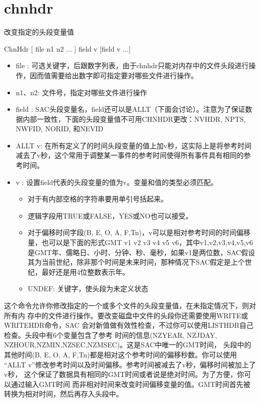\section{chnhdr}
\label{cmd:chnhdr}

改变指定的头段变量值

ChnHdr [ file n1 n2 ... ] field v [field v ...]

\begin{itemize}
\item file : 可选关键字，后跟数字列表，由于chnhdr只能对内存中的文件头段进行操作，因而值需要给出数字即可指定要对哪些文件进行操作。
\item n1、n2: 文件号，指定对哪些文件进行操作
\item field : SAC头段变量名，field还可以是ALLT（下面会讨论）。注意为了保证数据内部一致性，下面的头段变量值不可用CHNHDR更改：NVHDR, NPTS, NWFID, NORID, 和NEVID
\item ALLT v: 在所有定义了的时间头段变量的值上加v秒，这实际上是将参考时间减去了v秒，这个常用于调整某一事件的参考时间使得所有事件具有相同的参考时间。
\item v : 设置field代表的头段变量的值为v。变量和值的类型必须匹配。
	\begin{itemize}
	\item 对于有内部空格的字符串要用单引号括起来。
	\item 逻辑字段用TRUE或FALSE，YES或NO也可以接受。
	\item 对于偏移时间字段(B, E, O, A, F,Tn)，v可以是相对参考时间的时间偏移量，也可以是下面的形式GMT v1 v2 v3 v4 v5 v6，其中v1,v2,v3,v4,v5,v6是GMT年、儒略日、小时、分钟、秒、毫秒，如果v1是两位数，SAC假设其为当前世纪，除非那个时间是未来时间，那种情况下SAC假定是上个世纪，最好还是用4位整数表示年。
	\item UNDEF: 关键字，使头段为未定义状态
	\end{itemize}
\end{itemize}

这个命令允许你修改指定的一个或多个文件的头段变量值，在未指定情况下，则对所有内
存中的文件进行操作。要改变磁盘中文件的头段你还需要使用WRITE或WRITEHDR命令，SAC
会对新值做有效性检查，不过你可以使用LISTHDR自己检查。头段中有6个变量包含了参考
时间的信息(NZYEAR, NZJDAY, NZHOUR,NZMIN,NZSEC,NZMSEC)。这是SAC中唯一的GMT时间，
头段中的其他时间(B, E, O, A, F,Tn)都是相对这个参考时间的偏移秒数。你可以使用
``ALLT v''修改参考时间以及时间偏移。参考时间被减去了v秒，偏移时间被加上了v秒，
这个保证了数据具有相同的GMT时间或者说是绝对时间。为了方便，你可以通过输入GMT时间
而非相对时间来改变时间偏移变量的值。GMT时间首先被转换为相对时间，然后再存入头段中。

